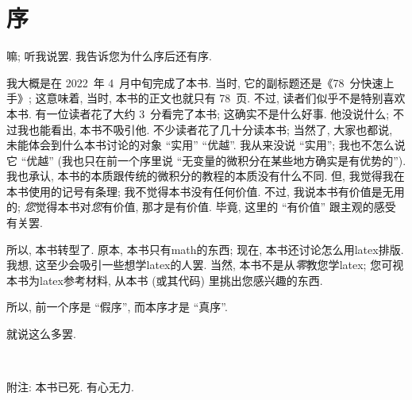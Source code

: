 \chapter{序}

嘛; 听我说罢.
我告诉您为什么序后还有序.

我大概是在 2022~年 4~月中旬完成了本书.
当时, 它的副标题还是《78~分快速上手》;
这意味着, 当时, 本书的正文也就只有 78~页.
不过, 读者们似乎不是特别喜欢本书.
有一位读者花了大约 3~分看完了本书;
这确实不是什么好事.
他没说什么; 不过我也能看出, 本书不吸引他.
不少读者花了几十分读本书;
当然了, 大家也都说,
未能体会到什么本书讨论的对象 ``实用'' ``优越''.
我从来没说 ``实用'';
我也不怎么说它 ``优越''
(我也只在前一个序里说
``无变量的微积分在某些地方确实是有优势的'').
我也承认,
本书的本质跟传统的微积分的教程的本质没有什么不同.
但, 我觉得我在本书使用的记号有条理;
我不觉得本书没有任何价值.
不过, 我说本书有价值是无用的;
\emph{您}觉得本书对\emph{您}有价值, 那才是有价值.
毕竟, 这里的 ``有价值'' 跟主观的感受有关罢.

所以, 本书转型了.
原本, 本书只有\gls{math}的东西;
现在, 本书还讨论怎么用\gls{latex}排版.
我想, 这至少会吸引一些想学\gls{latex}的人罢.
当然, 本书不是从\emph{零}教您学\gls{latex};
您可视本书为\gls{latex}参考材料,
从本书 (或其代码) 里挑出您感兴趣的东西.

所以, 前一个序是 ``假序'', 而本序才是 ``真序''.

就说这么多罢.

\begin{flushright}
    \theauthor\\
    \thedate
\end{flushright}

\vspace{2ex}

附注:
本书已死.
有心无力.
